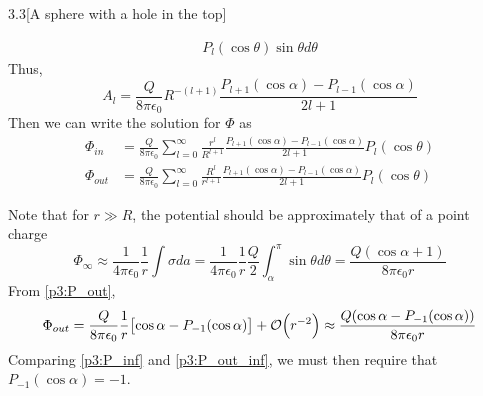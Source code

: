 \documentclass[12pt]{article}
\begin{document}
\begin{problem}{3.3}[A sphere with a hole in the top]
\begin{solution}
\begin{align}
    P_l(\cos\theta)\sin\theta d\theta
\end{align}
Thus,
\begin{equation}
    A_l=\frac{Q}{8\pi\epsilon_0}R^{-(l+1)}\frac{P_{l+1}(\cos\alpha)-P_{l-1}(\cos\alpha)}{2l+1} 
\end{equation}
Then we can write the solution for $\Phi$ as
\begin{subequations}
    \begin{align}
        \Phi_{in}&=\frac{Q}{8\pi\epsilon_0}\sum_{l=0}^\infty
            \frac{r^l}{R^{l+1}}\frac{P_{l+1}(\cos\alpha)-P_{l-1}(\cos\alpha)}
                {2l+1}P_l(\cos\theta)\\
        \Phi_{out}&=\frac{Q}{8\pi\epsilon_0}\sum_{l=0}^\infty
            \frac{R^l}{r^{l+1}}\frac{P_{l+1}(\cos\alpha)-P_{l-1}(\cos\alpha)}
            {2l+1}P_l(\cos\theta)\label{p3:P_out}
    \end{align} 
\end{subequations}

Note that for $r\gg R$, the potential should be approximately that of a point
charge
\begin{equation}\label{p3:P_inf}
    \Phi_\infty\approx\frac{1}{4\pi\epsilon_0}\frac{1}{r}\int\sigma da
    =\frac1{4\pi\epsilon_0}\frac1r\frac{Q}{2}\int_{\alpha}^\pi\sin\theta
    d\theta
    =\frac{Q(\cos\alpha+1)}{8\pi\epsilon_0r}
\end{equation}
From \eqref{p3:P_out},
\begin{align}\label{p3:P_out_inf}
    \Phi_{out}=\frac{Q}{8\pi\epsilon_0}\frac1r\qty[\cos\alpha-P_{-1}(\cos\alpha)]+\order{r^{-2}}\approx\frac{Q(\cos\alpha-P_{-1}(\cos\alpha))}{8\pi\epsilon_0
    r}
\end{align}
Comparing \eqref{p3:P_inf} and \eqref{p3:P_out_inf}, we must then require that
$P_{-1}(\cos\alpha)=-1$.


\end{solution}
\end{problem}
\end{document}
